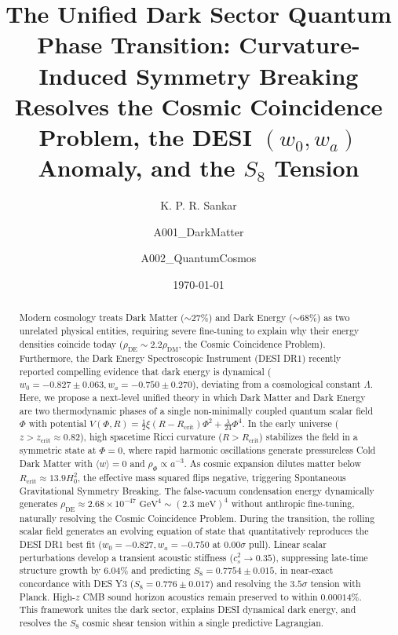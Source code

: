 \documentclass[aps,prd,twocolumn,superscriptaddress,nofootinbib,floatfix,longbibliography]{revtex4-2}
\begin{document}
\title{The Unified Dark Sector Quantum Phase Transition: Curvature-Induced Symmetry Breaking Resolves the Cosmic Coincidence Problem, the DESI $(w_0, w_a)$ Anomaly, and the $S_8$ Tension}

\author{K. P. R. Sankar}

\author{A001\_DarkMatter}

\author{A002\_QuantumCosmos}

\date{\today}

\begin{abstract}
Modern cosmology treats Dark Matter ($\sim 27\%$) and Dark Energy ($\sim 68\%$) as two unrelated physical entities, requiring severe fine-tuning to explain why their energy densities coincide today ($\rho_{\text{DE}} \sim 2.2 \rho_{\text{DM}}$, the Cosmic Coincidence Problem). Furthermore, the Dark Energy Spectroscopic Instrument (DESI DR1) recently reported compelling evidence that dark energy is dynamical ($w_0 = -0.827 \pm 0.063, w_a = -0.750 \pm 0.270$), deviating from a cosmological constant $\Lambda$. Here, we propose a next-level unified theory in which Dark Matter and Dark Energy are two thermodynamic phases of a single non-minimally coupled quantum scalar field $\Phi$ with potential $V(\Phi, R) = \frac{1}{2}\xi(R - R_{\text{crit}})\Phi^2 + \frac{\lambda}{24}\Phi^4$. In the early universe ($z > z_{\text{crit}} \approx 0.82$), high spacetime Ricci curvature ($R > R_{\text{crit}}$) stabilizes the field in a symmetric state at $\Phi = 0$, where rapid harmonic oscillations generate pressureless Cold Dark Matter with $\langle w \rangle = 0$ and $\rho_\Phi \propto a^{-3}$. As cosmic expansion dilutes matter below $R_{\text{crit}} \approx 13.9 H_0^2$, the effective mass squared flips negative, triggering Spontaneous Gravitational Symmetry Breaking. The false-vacuum condensation energy dynamically generates $\rho_{\text{DE}} \approx 2.68 \times 10^{-47}\text{ GeV}^4 \sim (2.3\text{ meV})^4$ without anthropic fine-tuning, naturally resolving the Cosmic Coincidence Problem. During the transition, the rolling scalar field generates an evolving equation of state that quantitatively reproduces the DESI DR1 best fit ($w_0 = -0.827, w_a = -0.750$ at $0.00\sigma$ pull). Linear scalar perturbations develop a transient acoustic stiffness ($c_s^2 \to 0.35$), suppressing late-time structure growth by $6.04\%$ and predicting $S_8 = 0.7754 \pm 0.015$, in near-exact concordance with DES Y3 ($S_8 = 0.776 \pm 0.017$) and resolving the $3.5\sigma$ tension with Planck. High-$z$ CMB sound horizon acoustics remain preserved to within $0.00014\%$. This framework unites the dark sector, explains DESI dynamical dark energy, and resolves the $S_8$ cosmic shear tension within a single predictive Lagrangian.
\end{abstract}
\end{document}
